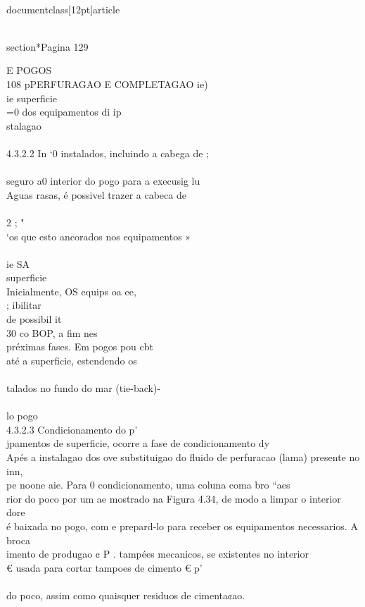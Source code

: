 \\documentclass[12pt]{article}
\begin{document}
\\section*{Pagina 129}

E POGOS\\
108 pPERFURAGAO E COMPLETAGAO ie)\\
ie superficie\\
=0 dos equipamentos di ip\\
stalagao\\
\\
4.3.2.2 In ‘0 instalados, incluindo a cabega de ;\\
\\
seguro a0 interior do pogo para a execusig lu\\
Aguas rasas, é possivel trazer a cabeca de\\
\\
2 ; "\\
‘os que esto ancorados nos equipamentos »\\
\\
ie SA\\
superficie\\
Inicialmente, OS equips oa ee,\\
; ibilitar\\
de possibil it\\
30 co BOP, a fim nes\\
préximas fases. Em pogos pou cbt\\
até a superficie, estendendo os\\
\\
talados no fundo do mar (tie-back)-\\
\\
lo pogo\\
4.3.2.3 Condicionamento do p'\\
jpamentos de superficie, ocorre a fase de condicionamento dy\\
Apés a instalagao dos ove substituigao do fluido de perfuracao (lama) presente no inn,\\
pe noone aie. Para 0 condicionamento, uma coluna coma bro “aes\\
rior do poco por um ae mostrado na Figura 4.34, de modo a limpar o interior dore\\
é baixada no pogo, com e prepard-lo para receber os equipamentos necessarios. A broca\\
imento de produgao ¢ P . tampées mecanicos, se existentes no interior\\
€ usada para cortar tampoes de cimento € p'\\
\\
do poco, assim como quaisquer residuos de cimenta¢ao.\\
\end{document}

